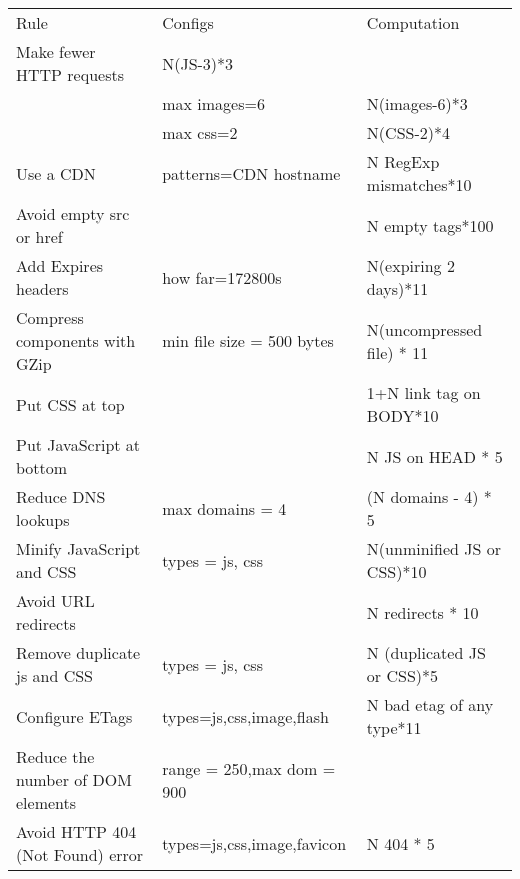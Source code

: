 \documentclass[11pt]{article}
\begin{document}
\begin{center}
\begin{tabular}{lll}
 Rule                               &  Configs                     &  Computation                 \\
 Make fewer HTTP requests           &  N(JS-3)*3                   &                              \\
                                    &  max images=6                &  N(images-6)*3               \\
                                    &  max css=2                   &  N(CSS-2)*4                  \\
 Use a CDN                          &  patterns=CDN hostname       &  N RegExp mismatches*10      \\
 Avoid empty src or href            &                              &  N empty tags*100            \\
 Add Expires headers                &  how far=172800s             &  N(expiring 2 days)*11       \\
 Compress components with GZip      &  min file size = 500 bytes   &  N(uncompressed file) * 11   \\
 Put CSS at top                     &                              &  1+N link tag on BODY*10     \\
 Put JavaScript at bottom           &                              &  N JS on HEAD * 5            \\
 Reduce DNS lookups                 &  max domains = 4             &  (N domains - 4) * 5         \\
 Minify JavaScript and CSS          &  types = js, css             &  N(unminified JS or CSS)*10  \\
 Avoid URL redirects                &                              &  N redirects * 10            \\
 Remove duplicate js and CSS        &  types = js, css             &  N (duplicated JS or CSS)*5  \\
 Configure ETags                    &  types=js,css,image,flash    &  N bad etag of any type*11   \\
 Reduce the number of DOM elements  &  range = 250,max dom = 900   &                              \\
 Avoid HTTP 404 (Not Found) error   &  types=js,css,image,favicon  &  N 404 * 5                   \\
\end{tabular}
\end{center}
\end{document}
